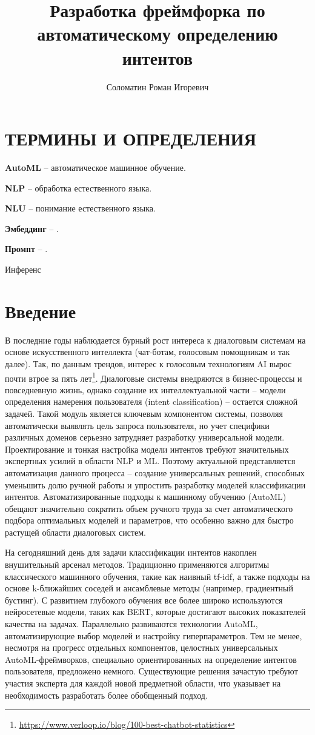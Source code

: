 \documentclass[14pt,a4paper,oneside,openany]{extbook}
\author{Соломатин Роман Игоревич}
\date{}
\title{Разработка фреймфорка по автоматическому определению интентов}
\begin{document}
\MyTOC

\chapter*{ТЕРМИНЫ И ОПРЕДЕЛЕНИЯ}
\label{sec:orge24d571}
\textbf{AutoML} -- автоматическое машинное обучение.

\textbf{NLP} -- обработка естественного языка.

\textbf{NLU} -- понимание естественного языка.

\textbf{Эмбеддинг} -- .

\textbf{Промпт} -- .

Инференс
\chapter*{Введение}
\label{sec:orgf946c4e}
В последние годы наблюдается бурный рост интереса к диалоговым системам на основе искусственного интеллекта (чат-ботам, голосовым помощникам и так далее). Так, по данным трендов, интерес к голосовым технологиям AI вырос почти втрое за пять лет\footnote{\url{https://www.verloop.io/blog/100-best-chatbot-statistics}}. Диалоговые системы внедряются в бизнес-процессы и повседневную жизнь, однако создание их интеллектуальной части – модели определения намерения пользователя (intent classification) – остается сложной задачей. Такой модуль является ключевым компонентом системы, позволяя автоматически выявлять цель запроса пользователя, но учет специфики различных доменов серьезно затрудняет разработку универсальной модели. Проектирование и тонкая настройка модели интентов требуют значительных экспертных усилий в области NLP и ML. Поэтому актуальной представляется автоматизация данного процесса – создание универсальных решений, способных уменьшить долю ручной работы и упростить разработку моделей классификации интентов. Автоматизированные подходы к машинному обучению (AutoML) обещают значительно сократить объем ручного труда за счет автоматического подбора оптимальных моделей и параметров, что особенно важно для быстро растущей области диалоговых систем.

На сегодняшний день для задачи классификации интентов накоплен внушительный арсенал методов. Традиционно применяются алгоритмы классического машинного обучения, такие как наивный tf-idf\autocite{joneskarensparck_statistical_1972}, а также подходы на основе k-ближайших соседей и ансамблевые методы (например, градиентный бустинг). С развитием глубокого обучения все более широко используются нейросетевые модели, таких как BERT\autocite{devlin_bert_2019}, которые достигают высоких показателей качества на задачах. Параллельно развиваются технологии AutoML, автоматизирующие выбор моделей и настройку гиперпараметров. Тем не менее, несмотря на прогресс отдельных компонентов, целостных универсальных AutoML-фреймворков, специально ориентированных на определение интентов пользователя, предложено немного. Существующие решения зачастую требуют участия эксперта для каждой новой предметной области, что указывает на необходимость разработать более обобщенный подход.
\end{document}
